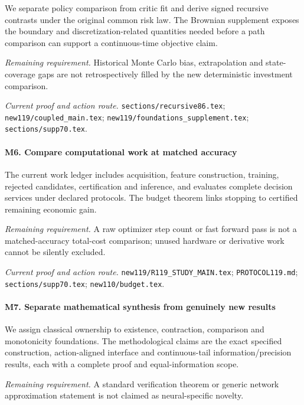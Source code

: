 We separate policy comparison from critic fit and derive signed recursive contrasts under the original common risk law. The Brownian supplement exposes the boundary and discretization-related quantities needed before a path comparison can support a continuous-time objective claim.

\par\emph{Remaining requirement.} Historical Monte Carlo bias, extrapolation and state-coverage gaps are not retrospectively filled by the new deterministic investment comparison.

\par\emph{Current proof and action route.} \nolinkurl{sections/recursive86.tex}; \nolinkurl{new119/coupled_main.tex}; \nolinkurl{new119/foundations_supplement.tex}; \nolinkurl{sections/supp70.tex}.

\paragraph{M6. Compare computational work at matched accuracy}

The current work ledger includes acquisition, feature construction, training, rejected candidates, certification and inference, and evaluates complete decision services under declared protocols. The budget theorem links stopping to certified remaining economic gain.

\par\emph{Remaining requirement.} A raw optimizer step count or fast forward pass is not a matched-accuracy total-cost comparison; unused hardware or derivative work cannot be silently excluded.

\par\emph{Current proof and action route.} \nolinkurl{new119/R119_STUDY_MAIN.tex}; \nolinkurl{PROTOCOL119.md}; \nolinkurl{sections/supp70.tex}; \nolinkurl{new110/budget.tex}.

\paragraph{M7. Separate mathematical synthesis from genuinely new results}

We assign classical ownership to existence, contraction, comparison and monotonicity foundations. The methodological claims are the exact specified construction, action-aligned interface and continuous-tail information/\allowbreak{}precision results, each with a complete proof and equal-information scope.

\par\emph{Remaining requirement.} A standard verification theorem or generic network approximation statement is not claimed as neural-specific novelty.


